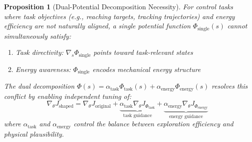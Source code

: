 \documentclass[10pt,a4paper]{amsart}
\newtheorem{proposition}{Proposition}
\begin{document}
	\begin{proposition}[Dual-Potential Decomposition Necessity]
		\label{prop:dual_necessity}
		For control tasks where task objectives (e.g., reaching targets, tracking trajectories) and energy efficiency are not naturally aligned, a single potential function $\Phi_{\text{single}}(s)$ cannot simultaneously satisfy:
		\begin{enumerate}
			\item Task directivity: $\nabla_s \Phi_{\text{single}}$ points toward task-relevant states
			\item Energy awareness: $\Phi_{\text{single}}$ encodes mechanical energy structure
		\end{enumerate}
		
		The dual decomposition $\Phi(s) = \alpha_{\text{task}}\Phi_{\text{task}}(s) + \alpha_{\text{energy}}\Phi_{\text{energy}}(s)$ resolves this conflict by enabling independent tuning of:
		\begin{equation}
			\nabla_\theta J_{\text{shaped}} = \nabla_\theta J_{\text{original}} + \underbrace{\alpha_{\text{task}} \nabla_\theta J_{\Phi_{\text{task}}}}_{\text{task guidance}} + \underbrace{\alpha_{\text{energy}} \nabla_\theta J_{\Phi_{\text{energy}}}}_{\text{energy guidance}}
		\end{equation}
		where $\alpha_{\text{task}}$ and $\alpha_{\text{energy}}$ control the balance between exploration efficiency and physical plausibility.
	\end{proposition}
\end{document}
